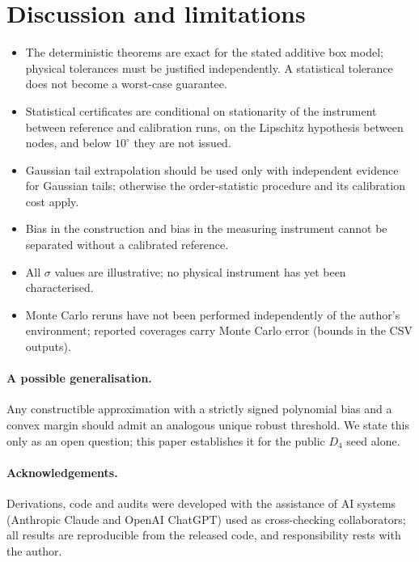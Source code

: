 \documentclass[11pt]{article}
\theoremstyle{definition}
\newcommand{\Dfour}{D_4}
\begin{document}
\section{Discussion and limitations}\label{sec:disc}
\begin{itemize}[nosep]
\item The deterministic theorems are exact for the stated additive box model; physical tolerances must be justified independently. A statistical tolerance does not become a worst-case guarantee.
\item Statistical certificates are conditional on stationarity of the instrument between reference and calibration runs, on the Lipschitz hypothesis between nodes, and below $10^\circ$ they are not issued.
\item Gaussian tail extrapolation should be used only with independent evidence for Gaussian tails; otherwise the order-statistic procedure and its calibration cost apply.
\item Bias in the construction and bias in the measuring instrument cannot be separated without a calibrated reference.
\item All $\sigma$ values are illustrative; no physical instrument has yet been characterised.
\item Monte Carlo reruns have not been performed independently of the author's environment; reported coverages carry Monte Carlo error (bounds in the CSV outputs).
\end{itemize}
\paragraph{A possible generalisation.}
Any constructible approximation with a strictly signed polynomial bias and a convex margin should admit an analogous unique robust threshold. We state this only as an open question; this paper establishes it for the public $\Dfour$ seed alone.

\paragraph{Acknowledgements.}
Derivations, code and audits were developed with the assistance of AI systems (Anthropic Claude and OpenAI ChatGPT) used as cross-checking collaborators; all results are reproducible from the released code, and responsibility rests with the author.

\appendix
\end{document}
